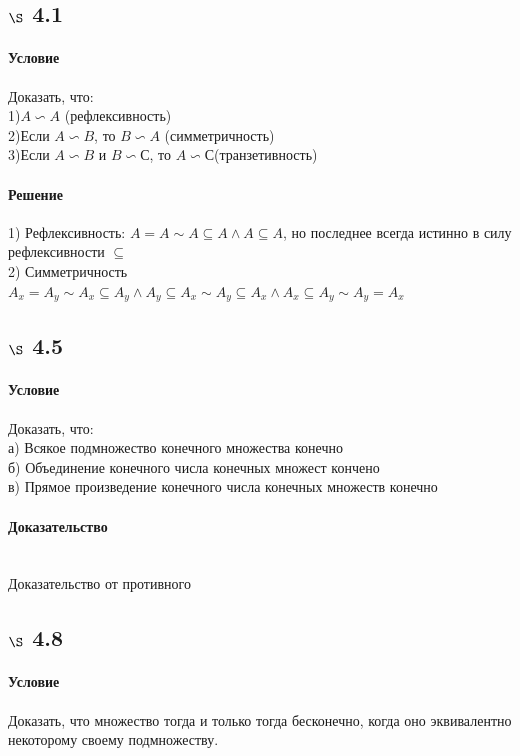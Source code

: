 \documentclass[a4paper,12pt]{article}
\begin{document}
\subsection*{$\S$ 4.1}
\paragraph*{Условие}
Доказать, что:\\
1)$ A \backsim A $ (рефлексивность)\\
2)Если $ A \backsim B $, то $ B \backsim A $ (симметричность)\\
3)Если $ A \backsim B $ и $ B \backsim С $, то $ A \backsim С $(транзетивность)
\paragraph*{Решение\\}
1) Рефлексивность: $ A = A \sim A \subseteq A \wedge A \subseteq A$, но последнее всегда истинно в силу рефлексивности $\subseteq$\\ 
2) Симметричность $A_x = A_y \sim A_x \subseteq A_y \wedge A_y \subseteq A_x \sim A_y \subseteq  A_x \wedge A_x \subseteq A_y \sim A_y = A_x$
\subsection*{$\S$ 4.5}
\paragraph*{Условие}
Доказать, что:\\
а) Всякое подмножество конечного множества конечно\\
б) Объединение конечного числа конечных множест кончено\\
в) Прямое произведение конечного числа конечных множеств конечно
\paragraph*{Доказательство}\mbox{}\\
Доказательство от противного

\subsection*{$\S$ 4.8}
\paragraph*{Условие}
Доказать, что множество тогда и только тогда бесконечно, когда оно эквивалентно некоторому своему подмножеству.
\end{document}
